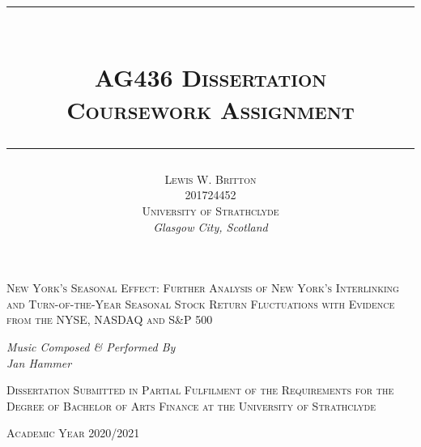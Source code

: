\documentclass[11pt, english]{article}
\newcommand{\HRule}[1]{\rule{\linewidth}{#1}}
\begin{document}


	\title{
                \HRule{0.5pt}\\ [0.3cm]
                \huge\textsc{AG436 Dissertation}\\
                \Large\textsc{Coursework Assignment}\\ [0.25cm]
                \HRule{0.5pt}
                }
	\author{\textsc{Lewis W. Britton}\\
                \textsc{201724452}\\
                \textsc{University of Strathclyde}\\
		\textit{Glasgow City, Scotland}
                }
	\date{}
	\maketitle

        \begin{center}
                \textsc{New York's Seasonal Effect: Further Analysis of New York's Interlinking and Turn-of-the-Year Seasonal Stock Return Fluctuations with Evidence from the NYSE, NASDAQ and S\&P 500}
        \end{center}

        \vspace{\fill}

	\begin{center}
		\textit{Music Composed \& Performed By\\
		Jan Hammer}
	\end{center}

	\begin{center}
	\end{center}

        \begin{center}
        	\textsc{Dissertation Submitted in Partial Fulfilment of the Requirements for the Degree of Bachelor of Arts Finance at the University of Strathclyde}
        \end{center}

        \begin{center}
		\textsc{Academic Year 2020/2021}
        \end{center}

\newpage

\end{document}
